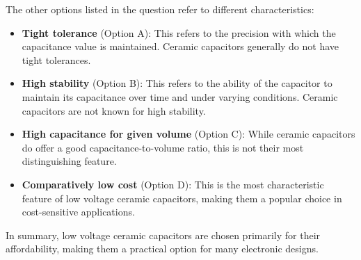 The other options listed in the question refer to different characteristics:
\begin{itemize}
    \item \textbf{Tight tolerance} (Option A): This refers to the precision with which the capacitance value is maintained. Ceramic capacitors generally do not have tight tolerances.
    \item \textbf{High stability} (Option B): This refers to the ability of the capacitor to maintain its capacitance over time and under varying conditions. Ceramic capacitors are not known for high stability.
    \item \textbf{High capacitance for given volume} (Option C): While ceramic capacitors do offer a good capacitance-to-volume ratio, this is not their most distinguishing feature.
    \item \textbf{Comparatively low cost} (Option D): This is the most characteristic feature of low voltage ceramic capacitors, making them a popular choice in cost-sensitive applications.
\end{itemize}

In summary, low voltage ceramic capacitors are chosen primarily for their affordability, making them a practical option for many electronic designs.

